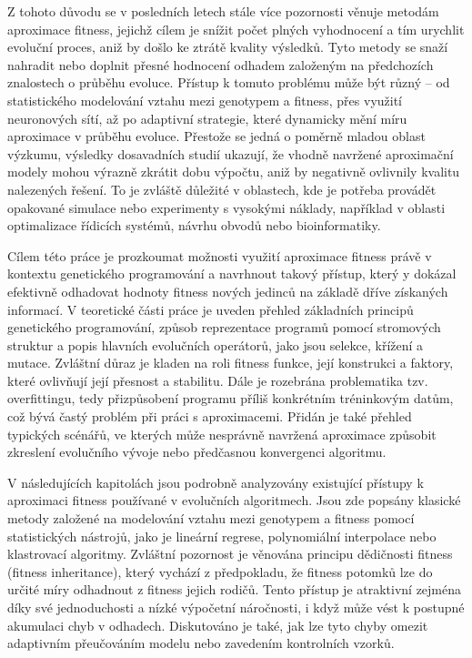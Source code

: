 \documentclass[12pt,a4paper]{report}
\begin{document}
\par Z tohoto důvodu se v posledních letech stále více pozornosti věnuje metodám aproximace fitness, jejichž cílem je snížit počet plných vyhodnocení a tím urychlit evoluční proces, aniž by došlo ke ztrátě kvality výsledků. Tyto metody se snaží nahradit nebo doplnit přesné hodnocení odhadem založeným na předchozích znalostech o průběhu evoluce. Přístup k tomuto problému může být různý – od statistického modelování vztahu mezi genotypem a fitness, přes využití neuronových sítí, až po adaptivní strategie, které dynamicky mění míru aproximace v průběhu evoluce. Přestože se jedná o poměrně mladou oblast výzkumu, výsledky dosavadních studií ukazují, že vhodně navržené aproximační modely mohou výrazně zkrátit dobu výpočtu, aniž by negativně ovlivnily kvalitu nalezených řešení. To je zvláště důležité v oblastech, kde je potřeba provádět opakované simulace nebo experimenty s vysokými náklady, například v oblasti optimalizace řídicích systémů, návrhu obvodů nebo bioinformatiky.  

\par Cílem této práce je prozkoumat možnosti využití aproximace fitness právě v kontextu genetického programování a navrhnout takový přístup, který y dokázal efektivně odhadovat hodnoty fitness nových jedinců na základě dříve získaných informací. V teoretické části práce je uveden přehled základních principů genetického programování, způsob reprezentace programů pomocí stromových struktur a popis hlavních evolučních operátorů, jako jsou selekce, křížení a mutace. Zvláštní důraz je kladen na roli fitness funkce, její konstrukci a faktory, které ovlivňují její přesnost a stabilitu. Dále je rozebrána problematika tzv. overfittingu, tedy přizpůsobení programu příliš konkrétním tréninkovým datům, což bývá častý problém při práci s aproximacemi. Přidán je také přehled typických scénářů, ve kterých může nesprávně navržená aproximace způsobit zkreslení evolučního vývoje nebo předčasnou konvergenci algoritmu.

\par V následujících kapitolách jsou podrobně analyzovány existující přístupy k aproximaci fitness používané v evolučních algoritmech. Jsou zde popsány klasické metody založené na modelování vztahu mezi genotypem a fitness pomocí statistických nástrojů, jako je lineární regrese, polynomiální interpolace nebo klastrovací algoritmy. Zvláštní pozornost je věnována principu dědičnosti fitness (fitness inheritance), který vychází z předpokladu, že fitness potomků lze do určité míry odhadnout z fitness jejich rodičů. Tento přístup je atraktivní zejména díky své jednoduchosti a nízké výpočetní náročnosti, i když může vést k postupné akumulaci chyb v odhadech. Diskutováno je také, jak lze tyto chyby omezit adaptivním přeučováním modelu nebo zavedením kontrolních vzorků.
\end{document}
